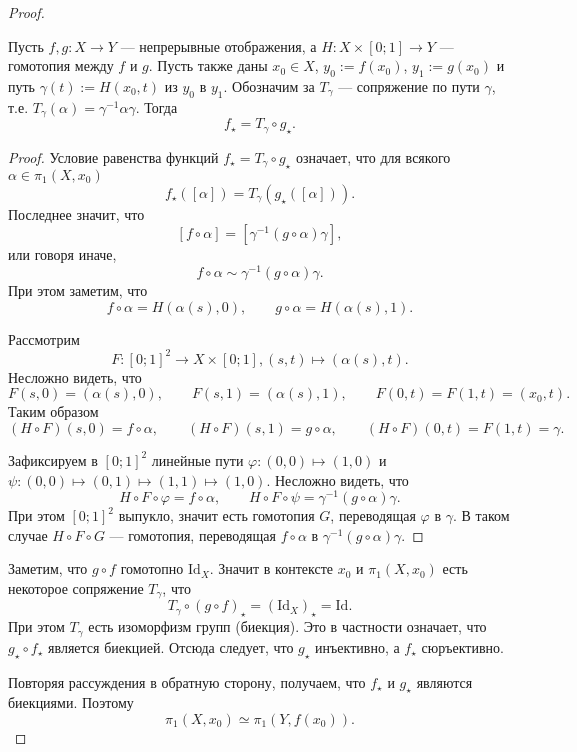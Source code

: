 \documentclass[12pt,a4paper]{article}
\newcommand{\Id}{\ensuremath{\mathrm{Id}}\xspace}
\begin{document}
    \begin{proof}
        \begin{thlemma}
            Пусть $f, g: X \to Y$ --- непрерывные отображения, а $H: X \times [0; 1] \to Y$ --- гомотопия между $f$ и $g$. Пусть также даны $x_0 \in X$, $y_0 := f(x_0)$, $y_1 := g(x_0)$ и путь $\gamma(t) := H(x_0, t)$ из $y_0$ в $y_1$. Обозначим за $T_\gamma$ --- сопряжение по пути $\gamma$, т.е. $T_\gamma(\alpha) = \gamma^{-1} \alpha \gamma$. Тогда
            \[f_\star = T_\gamma \circ g_\star.\]
        \end{thlemma}

        \begin{proof}
            Условие равенства функций $f_\star = T_\gamma \circ g_\star$ означает, что для всякого $\alpha \in \pi_1(X, x_0)$
            \[f_\star([\alpha]) = T_\gamma(g_\star([\alpha])).\]
            Последнее значит, что
            \[[f \circ \alpha] = [\gamma^{-1} (g \circ \alpha) \gamma],\]
            или говоря иначе,
            \[f \circ \alpha \sim \gamma^{-1} (g \circ \alpha) \gamma.\]
            При этом заметим, что
            \[f \circ \alpha = H(\alpha(s), 0), \qquad g \circ \alpha = H(\alpha(s), 1).\]

            Рассмотрим
            \[F: [0; 1]^2 \to X \times [0; 1], (s, t) \mapsto (\alpha(s), t).\]
            Несложно видеть, что
            \[
                F(s, 0) = (\alpha(s), 0),
                \qquad
                F(s, 1) = (\alpha(s), 1),
                \qquad
                F(0, t) = F(1, t) = (x_0, t).
            \]
            Таким образом
            \[
                (H \circ F)(s, 0) = f \circ \alpha,
                \qquad
                (H \circ F)(s, 1) = g \circ \alpha,
                \qquad
                (H \circ F)(0, t) = F(1, t) = \gamma.
            \]
            
            Зафиксируем в $[0; 1]^2$ линейные пути $\varphi: (0, 0) \mapsto (1, 0)$ и $\psi: (0, 0) \mapsto (0, 1) \mapsto (1, 1) \mapsto (1, 0)$. Несложно видеть, что
            \[H \circ F \circ \varphi = f \circ \alpha, \qquad H \circ F \circ \psi = \gamma^{-1} (g \circ \alpha) \gamma.\]
            При этом $[0; 1]^2$ выпукло, значит есть гомотопия $G$, переводящая $\varphi$ в $\gamma$. В таком случае $H \circ F \circ G$ --- гомотопия, переводящая $f \circ \alpha$ в $\gamma^{-1} (g \circ \alpha) \gamma$.
        \end{proof}

        Заметим, что $g \circ f$ гомотопно $\Id_X$. Значит в контексте $x_0$ и $\pi_1(X, x_0)$ есть некоторое сопряжение $T_\gamma$, что
        \[T_\gamma \circ (g \circ f)_\star = (\Id_X)_\star = \Id.\]
        При этом $T_\gamma$ есть изоморфизм групп (биекция). Это в частности означает, что $g_\star \circ f_\star$ является биекцией. Отсюда следует, что $g_\star$ инъективно, а $f_\star$ сюръективно.

        Повторяя рассуждения в обратную сторону, получаем, что $f_\star$ и $g_\star$ являются биекциями. Поэтому
        \[\pi_1(X, x_0) \simeq \pi_1(Y, f(x_0)).\]
    \end{proof}
\end{document}
